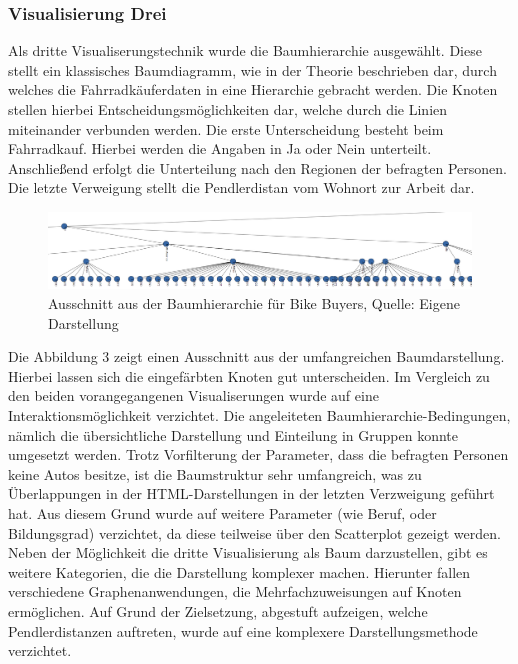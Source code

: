 \documentclass[usegeometry=true]{scrartcl}
\begin{document}
\subsubsection{Visualisierung Drei}
Als dritte Visualiserungstechnik wurde die Baumhierarchie ausgewählt. Diese stellt ein klassisches Baumdiagramm, wie in der Theorie beschrieben dar, durch welches die Fahrradkäuferdaten in eine Hierarchie gebracht werden. Die Knoten stellen hierbei Entscheidungsmöglichkeiten dar, welche durch die Linien miteinander verbunden werden. Die erste Unterscheidung besteht beim Fahrradkauf. Hierbei werden die Angaben in Ja oder Nein unterteilt. Anschließend erfolgt die Unterteilung nach den Regionen der befragten Personen. Die letzte Verweigung stellt die Pendlerdistan vom Wohnort zur Arbeit dar. 
\begin{figure}[h]
\begin{center}
\includegraphics[width=16cm]{Bilder/V3Baumhierarchie.png}
\caption{Ausschnitt aus der Baumhierarchie für Bike Buyers, Quelle: Eigene Darstellung}
\end{center}
\end{figure}
\newline
Die Abbildung 3 zeigt einen Ausschnitt aus der umfangreichen Baumdarstellung. Hierbei lassen sich die eingefärbten Knoten gut unterscheiden. Im Vergleich zu den beiden vorangegangenen Visualiserungen wurde auf eine Interaktionsmöglichkeit verzichtet. Die angeleiteten Baumhierarchie-Bedingungen, nämlich die übersichtliche Darstellung und Einteilung in Gruppen konnte umgesetzt werden. Trotz Vorfilterung der Parameter, dass die befragten Personen keine Autos besitze, ist die Baumstruktur sehr umfangreich, was zu Überlappungen in der HTML-Darstellungen in der letzten Verzweigung geführt hat. Aus diesem Grund wurde auf weitere Parameter (wie Beruf, oder Bildungsgrad) verzichtet, da diese teilweise über den Scatterplot gezeigt werden. Neben der Möglichkeit die dritte Visualisierung als Baum darzustellen, gibt es weitere Kategorien, die die Darstellung komplexer machen. Hierunter fallen verschiedene Graphenanwendungen, die Mehrfachzuweisungen auf Knoten ermöglichen. Auf Grund der Zielsetzung, abgestuft aufzeigen, welche Pendlerdistanzen auftreten, wurde auf eine komplexere Darstellungsmethode verzichtet. 
\end{document}

